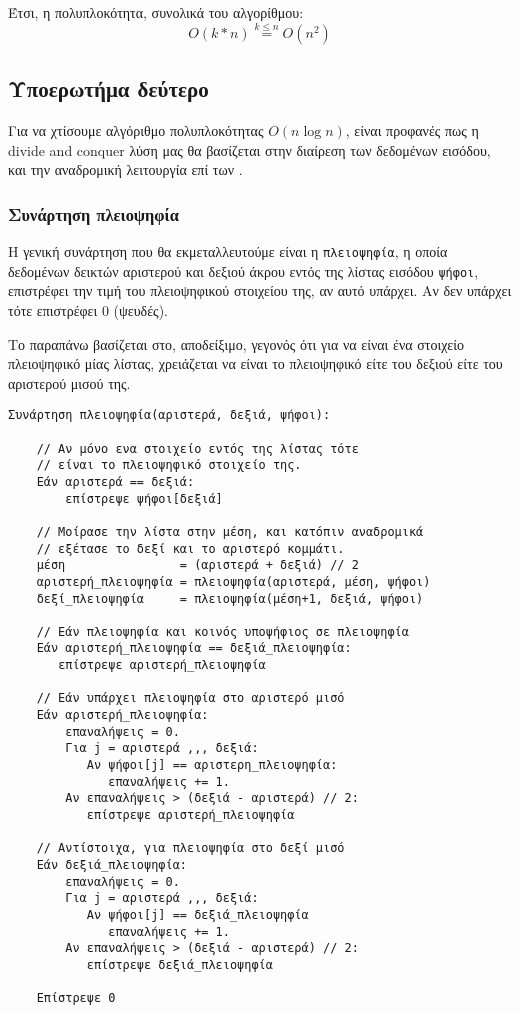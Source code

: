 \documentclass[a4paper,11pt]{article}
\begin{document}
Έτσι, η πολυπλοκότητα, συνολικά του αλγορίθμου:
\begin{equation}
\label{eq:2}
O(k*n) \stackrel{k\leq n}{=} O(n^{2})
\end{equation}


\subsection{Υποερωτήμα δεύτερο}
\label{sec:orgd7e8734}
Για να χτίσουμε αλγόριθμο πολυπλοκότητας \(O(n\log{n})\), είναι προφανές πως η divide
and conquer λύση μας θα βασίζεται στην διαίρεση των δεδομένων εισόδου, και την
αναδρομική λειτουργία επί των .


\subsubsection{Συνάρτηση πλειοψηφία}
\label{sec:org392bb50}
Η γενική συνάρτηση που θα εκμεταλλευτούμε είναι η \texttt{πλειοψηφία}, η οποία δεδομένων
δεικτών αριστερού και δεξιού άκρου εντός της λίστας εισόδου \texttt{ψήφοι}, επιστρέφει
την τιμή του πλειοψηφικού στοιχείου της, αν αυτό υπάρχει. Αν δεν υπάρχει τότε
επιστρέφει 0 (ψευδές).

Το παραπάνω βασίζεται στο, αποδείξιμο, γεγονός ότι για να είναι ένα στοιχείο
πλειοψηφικό μίας λίστας, χρειάζεται να είναι το πλειοψηφικό είτε του δεξιού είτε
του αριστερού μισού της.


\begin{verbatim}
Συνάρτηση πλειοψηφία(αριστερά, δεξιά, ψήφοι):

    // Αν μόνο ενα στοιχείο εντός της λίστας τότε
    // είναι το πλειοψηφικό στοιχείο της.
    Εάν αριστερά == δεξιά:
        επίστρεψε ψήφοι[δεξιά]

    // Μοίρασε την λίστα στην μέση, και κατόπιν αναδρομικά
    // εξέτασε το δεξί και το αριστερό κομμάτι.
    μέση                = (αριστερά + δεξιά) // 2
    αριστερή_πλειοψηφία = πλειοψηφία(αριστερά, μέση, ψήφοι)
    δεξί_πλειοψηφία     = πλειοψηφία(μέση+1, δεξιά, ψήφοι)

    // Εάν πλειοψηφία και κοινός υποψήφιος σε πλειοψηφία
    Εάν αριστερή_πλειοψηφία == δεξιά_πλειοψηφία:
       επίστρεψε αριστερή_πλειοψηφία

    // Εάν υπάρχει πλειοψηφία στο αριστερό μισό
    Εάν αριστερή_πλειοψηφία:
        επαναλήψεις = 0.
        Για j = αριστερά ,,, δεξιά:
           Αν ψήφοι[j] == αριστερη_πλειοψηφία:
              επαναλήψεις += 1.
        Αν επαναλήψεις > (δεξιά - αριστερά) // 2:
           επίστρεψε αριστερή_πλειοψηφία

    // Αντίστοιχα, για πλειοψηφία στο δεξί μισό
    Εάν δεξιά_πλειοψηφία:
        επαναλήψεις = 0.
        Για j = αριστερά ,,, δεξιά:
           Αν ψήφοι[j] == δεξιά_πλειοψηφία
              επαναλήψεις += 1.
        Αν επαναλήψεις > (δεξιά - αριστερά) // 2:
           επίστρεψε δεξιά_πλειοψηφία

    Επίστρεψε 0
\end{verbatim}
\end{document}
